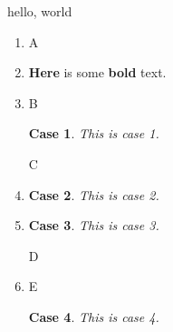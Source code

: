 \documentclass{amsart}
\newtheorem{case}{Case}
\begin{document}
hello, world

\begin{enumerate}

\item A

\item \textbf{Here} is some \textbf{bold} text.

\item B

\begin{case}
This is case 1.
\end{case}

C

\item \begin{case}This is case 2.\end{case}

\item \begin{case}This is case 3.\end{case}

D

\item E \begin{case}This is case 4.\end{case}

\end{enumerate}
\end{document}
